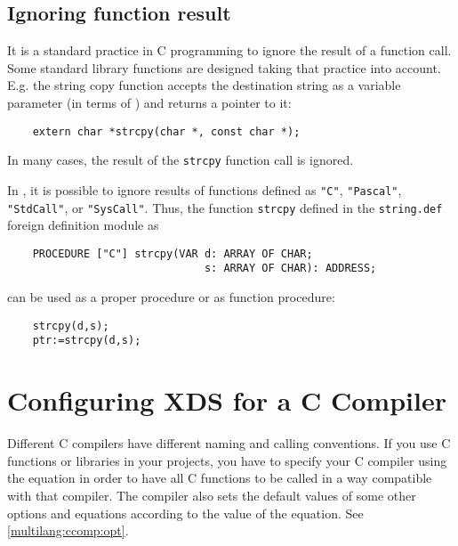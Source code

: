 \subsection{Ignoring function result}

It is a standard practice in C programming to ignore the result of
a function call. Some standard library functions are designed
taking that practice into account. E.g. the string copy
function accepts the destination string as a variable parameter (in
terms of \mt{}) and returns a pointer to it:

\verb'    extern char *strcpy(char *, const char *);'

In many cases, the result of the {\tt strcpy} function call is ignored.

In \xds{}, it is possible to ignore results of functions
defined as \verb'"C"', \verb'"Pascal"', \verb'"StdCall"', or \verb'"SysCall"'.
Thus, the function {\tt strcpy} defined in the \verb'string.def'
foreign definition module as

\verb'    PROCEDURE ["C"] strcpy(VAR d: ARRAY OF CHAR;'\\
\verb'                               s: ARRAY OF CHAR): ADDRESS;'

can be used as a proper procedure or as function procedure:

\verb'    strcpy(d,s);'\\
\verb'    ptr:=strcpy(d,s);'

\ifgencode


\section{Configuring XDS for a C Compiler}\label{multilang:ccomp}


Different C compilers have different naming and calling conventions.
If you use C functions or libraries in your projects,
you have to specify your C compiler using the  equation in
order to have all C functions to be called in a way compatible with
that compiler. The compiler also sets the default values of some
other options and equations according to the value of the  equation.
\iflinux \else See \ref{multilang:ccomp:opt}. \fi %

